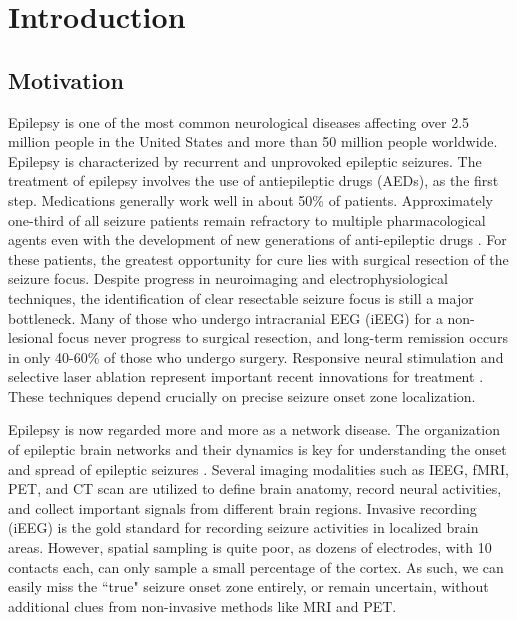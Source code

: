 
\chapter{Introduction}

\section{Motivation}
Epilepsy is one of the most common neurological diseases affecting over 2.5 million people in the United States and more than 50 million people worldwide. Epilepsy is characterized by recurrent and unprovoked epileptic seizures. The treatment of epilepsy involves the use of antiepileptic drugs (AEDs), as the first step. Medications generally work well in about 50\% of  patients. Approximately one-third of all seizure patients remain refractory to multiple pharmacological agents even with the development of new generations of anti-epileptic drugs \citep{franco2016challenges}. For these patients, the greatest opportunity for cure lies with surgical resection of the seizure focus. Despite progress in neuroimaging and electrophysiological techniques, the identification of clear resectable seizure focus is still a major bottleneck. Many of those who undergo intracranial EEG (iEEG) for a non-lesional focus never progress to surgical resection, and long-term remission occurs in only 40-60\% of those who undergo surgery. Responsive neural stimulation and selective laser ablation represent important recent innovations for treatment \citep{youngerman2018laser}. These techniques depend crucially on precise seizure onset zone localization.

Epilepsy is now regarded more and more as a network disease. The organization of epileptic brain networks and their dynamics is key for understanding the onset and spread of epileptic seizures \citep{davis2021wheels}. Several imaging modalities such as IEEG, fMRI, PET, and CT scan are utilized to define brain anatomy, record neural activities, and collect important signals from different brain regions. Invasive recording (iEEG) is the gold standard for recording seizure activities in localized brain areas. However, spatial sampling is quite poor, as dozens of electrodes, with 10 contacts each, can only sample a small percentage of the cortex. As such, we can easily miss the ``true" seizure onset zone entirely, or remain uncertain, without additional clues from non-invasive methods like MRI and PET. 

